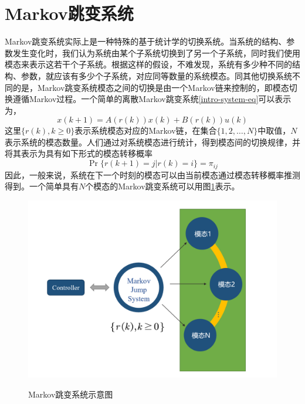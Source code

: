 \section{Markov跳变系统}
	Markov跳变系统实际上是一种特殊的基于统计学的切换系统。当系统的结构、参数发生变化时，我们认为系统由某个子系统切换到了另一个子系统，同时我们使用模态来表示这若干个子系统。根据这样的假设，不难发现，系统有多少种不同的结构、参数，就应该有多少个子系统，对应同等数量的系统模态。同其他切换系统不同的是，Markov跳变系统模态之间的切换是由一个Markov链来控制的，即模态切换遵循Markov过程。一个简单的离散Markov跳变系统\eqref{intro-system-eq}可以表示为，
	\begin{equation}\label{intro-system-eq}
		x(k+1)=A(r(k))x(k)+B(r(k))u(k)
	\end{equation}
	这里$\{r(k),k\geq 0 \}$表示系统模态对应的Markov链，在集合$\{1,2,\dots,N \}$中取值，$N$表示系统的模态数量。人们通过对系统模态进行统计，得到模态间的切换规律，并将其表示为具有如下形式的模态转移概率
	\begin{equation}\label{introduction-tps-sys}
	\Pr\{r(k+1)=j|r(k)=i \}=\pi_{ij}
	\end{equation}
	因此，一般来说，系统在下一个时刻的模态可以由当前模态通过模态转移概率推测得到。一个简单具有$N$个模态的Markov跳变系统可以用图\ref{intro_system}表示。
	\begin{figure}[!htb] 
		\centering\includegraphics[scale=0.25]{./figures/introduction/system.png}\\ 
		\caption{Markov跳变系统示意图}
		\label{intro_system}
	\end{figure}


